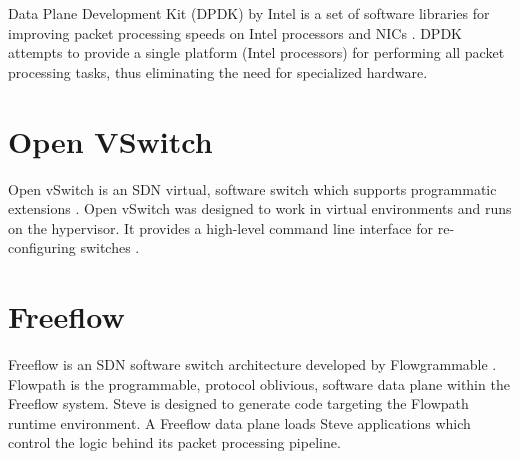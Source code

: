 Data Plane Development Kit (DPDK) by Intel is a set of software libraries for improving packet processing speeds on Intel processors and NICs \cite{dpdk_webpage}. DPDK attempts to provide a single platform (Intel processors) for performing all packet processing tasks, thus eliminating the need for specialized hardware.

\section{Open VSwitch}
\label{rel:vswitch}

Open vSwitch is an SDN virtual, software switch which supports programmatic extensions \cite{ovs_webpage, ovs2009extending, ovs2013}. Open vSwitch was designed to work in virtual environments and runs on the hypervisor. It provides a high-level command line interface for re-configuring switches \cite{ovs_man_page}.

\section{Freeflow}
\label{rel:freeflow}

Freeflow is an SDN software switch architecture developed
by Flowgrammable \cite{freeflow_software}. Flowpath is the programmable, protocol oblivious, software data plane within the Freeflow system. Steve is
designed to generate code targeting the Flowpath runtime environment. A Freeflow data plane loads Steve applications which control the logic behind its packet processing pipeline.
